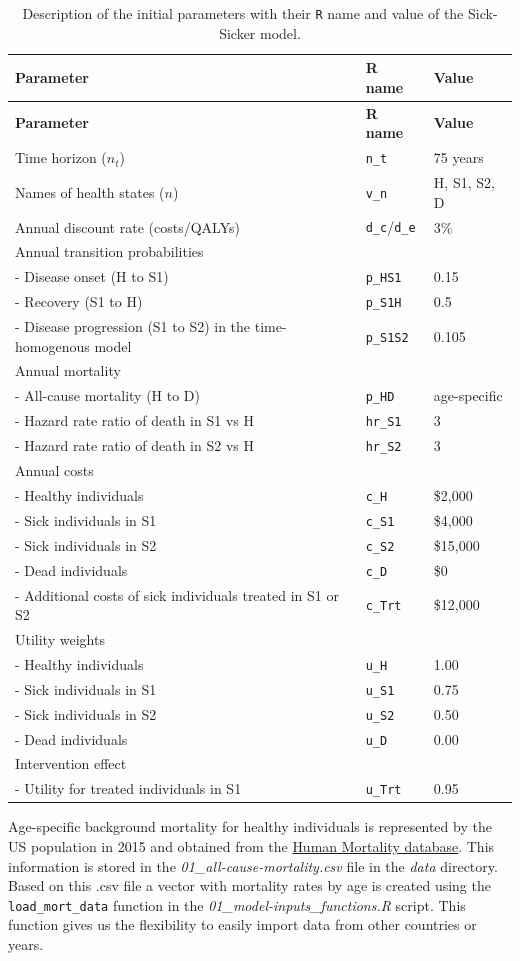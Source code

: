 \documentclass[]{book}
\begin{document}
\begin{longtable}[]{@{}lll@{}}
\caption{\label{tab:parameters} Description of the initial parameters with their \texttt{R} name and value of the Sick-Sicker model.}\tabularnewline
\toprule
\textbf{Parameter} & \textbf{R name} & \textbf{Value}\tabularnewline
\midrule
\endfirsthead
\toprule
\textbf{Parameter} & \textbf{R name} & \textbf{Value}\tabularnewline
\midrule
\endhead
Time horizon (\(n_t\)) & \texttt{n\_t} & 75 years\tabularnewline
Names of health states (\(n\)) & \texttt{v\_n} & H, S1, S2, D\tabularnewline
Annual discount rate (costs/QALYs) & \texttt{d\_c}/\texttt{d\_e} & 3\%\tabularnewline
Annual transition probabilities & &\tabularnewline
- Disease onset (H to S1) & \texttt{p\_HS1} & 0.15\tabularnewline
- Recovery (S1 to H) & \texttt{p\_S1H} & 0.5\tabularnewline
- Disease progression (S1 to S2) in the time-homogenous model & \texttt{p\_S1S2} & 0.105\tabularnewline
Annual mortality & &\tabularnewline
- All-cause mortality (H to D) & \texttt{p\_HD} & age-specific\tabularnewline
- Hazard rate ratio of death in S1 vs H & \texttt{hr\_S1} & 3\tabularnewline
- Hazard rate ratio of death in S2 vs H & \texttt{hr\_S2} & 3\tabularnewline
Annual costs & &\tabularnewline
- Healthy individuals & \texttt{c\_H} & \$2,000\tabularnewline
- Sick individuals in S1 & \texttt{c\_S1} & \$4,000\tabularnewline
- Sick individuals in S2 & \texttt{c\_S2} & \$15,000\tabularnewline
- Dead individuals & \texttt{c\_D} & \$0\tabularnewline
- Additional costs of sick individuals treated in S1 or S2 & \texttt{c\_Trt} & \$12,000\tabularnewline
Utility weights & &\tabularnewline
- Healthy individuals & \texttt{u\_H} & 1.00\tabularnewline
- Sick individuals in S1 & \texttt{u\_S1} & 0.75\tabularnewline
- Sick individuals in S2 & \texttt{u\_S2} & 0.50\tabularnewline
- Dead individuals & \texttt{u\_D} & 0.00\tabularnewline
Intervention effect & &\tabularnewline
- Utility for treated individuals in S1 & \texttt{u\_Trt} & 0.95\tabularnewline
\bottomrule
\end{longtable}

Age-specific background mortality for healthy individuals is represented by the US population in 2015 and obtained from the \href{https://www.mortality.org}{Human Mortality database}. This information is stored in the \emph{01\_all-cause-mortality.csv} file in the \emph{data} directory. Based on this .csv file a vector with mortality rates by age is created using the \texttt{load\_mort\_data} function in the \emph{01\_model-inputs\_functions.R} script. This function gives us the flexibility to easily import data from other countries or years.
\end{document}
